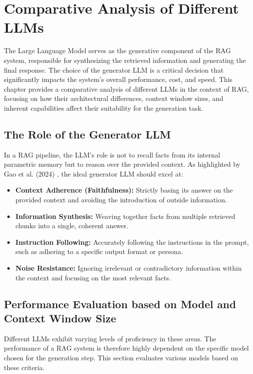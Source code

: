\chapter{Comparative Analysis of Different LLMs}
\label{chap:llm_comparison}

The Large Language Model serves as the generative component of the RAG system, responsible for synthesizing the retrieved information and generating the final response. The choice of the generator LLM is a critical decision that significantly impacts the system's overall performance, cost, and speed. This chapter provides a comparative analysis of different LLMs in the context of RAG, focusing on how their architectural differences, context window sizes, and inherent capabilities affect their suitability for the generation task.

\section{The Role of the Generator LLM}
In a RAG pipeline, the LLM's role is not to recall facts from its internal parametric memory but to reason over the provided context. As highlighted by Gao et al. (2024) \autocite{gao2024retrievalaugmented}, the ideal generator LLM should excel at:
\begin{itemize}
    \item \textbf{Context Adherence (Faithfulness):} Strictly basing its answer on the provided context and avoiding the introduction of outside information.
    \item \textbf{Information Synthesis:} Weaving together facts from multiple retrieved chunks into a single, coherent answer.
    \item \textbf{Instruction Following:} Accurately following the instructions in the prompt, such as adhering to a specific output format or persona.
    \item \textbf{Noise Resistance:} Ignoring irrelevant or contradictory information within the context and focusing on the most relevant facts.
\end{itemize}

\section{Performance Evaluation based on Model and Context Window Size}
Different LLMs exhibit varying levels of proficiency in these areas. The performance of a RAG system is therefore highly dependent on the specific model chosen for the generation step. This section evaluates various models based on these criteria.

